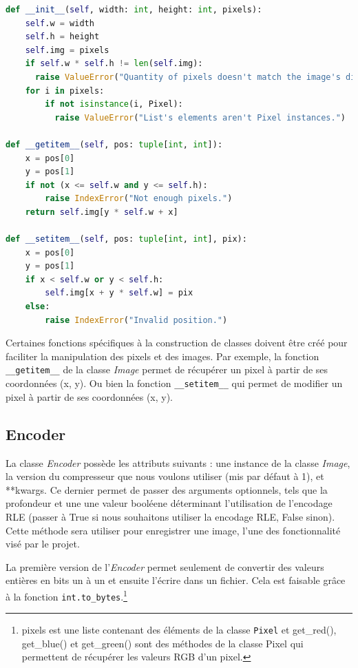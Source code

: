 \documentclass[utf8]{article}
\begin{document}
\begin{lstlisting}[language=Python, basicstyle=\small]
 def __init__(self, width: int, height: int, pixels):
    self.w = width
    self.h = height
    self.img = pixels
    if self.w * self.h != len(self.img):
      raise ValueError("Quantity of pixels doesn't match the image's dimension.")
    for i in pixels:
        if not isinstance(i, Pixel):
		  raise ValueError("List's elements aren't Pixel instances.")

def __getitem__(self, pos: tuple[int, int]):
    x = pos[0]
    y = pos[1]
    if not (x <= self.w and y <= self.h):
        raise IndexError("Not enough pixels.")
    return self.img[y * self.w + x]

def __setitem__(self, pos: tuple[int, int], pix):
    x = pos[0]
    y = pos[1]
    if x < self.w or y < self.h:
        self.img[x + y * self.w] = pix
    else:
        raise IndexError("Invalid position.")

\end{lstlisting}
Certaines fonctions spécifiques à la construction de classes doivent être créé pour faciliter la manipulation des pixels et des images. Par exemple, la fonction \texttt{__getitem__} de la classe \textit{Image} permet de récupérer un pixel à partir de ses coordonnées (x, y).
Ou bien la fonction \texttt{__setitem__} qui permet de modifier un pixel à partir de ses coordonnées (x, y).


\subsection{Encoder}
La classe \textit{Encoder} possède les attributs suivants : une instance de la classe \textit{Image}, la version du compresseur que nous  voulons utiliser (mis par défaut à 1), et **kwargs. Ce dernier permet de passer des arguments optionnels, tels que la profondeur et une une valeur booléene déterminant l'utilisation de l'encodage RLE (passer à True si nous souhaitons utiliser la encodage RLE, False sinon). Cette méthode sera utiliser pour enregistrer une image, l'une des fonctionnalité visé par le projet.

La première version de l'\textit{Encoder} permet seulement de convertir des valeurs entières en bits un à un et ensuite l'écrire dans un fichier. Cela est faisable grâce à la fonction \texttt{int.to_bytes}.\footnote{pixels est une liste contenant des éléments de la classe \texttt{Pixel} et get_red(), get_blue() et get_green() sont des méthodes de la classe Pixel qui permettent de récupérer les valeurs RGB d'un pixel.}
\end{document}

